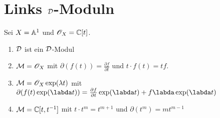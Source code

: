 
\chapter{Links $\mathcal{D}$-Moduln}

\begin{exmp}
Sei $X=\mathbb{A}^1$ und $\mathscr{O}_X=\mathbb{C}[t]$.
\begin{enumerate}
\item $\mathcal{D}$ ist ein $\mathcal{D}$-Modul
\item $\mathcal{M}=\mathscr{O}_X$ mit $\partial(f(t))=\frac{\partial f}{\partial t}$ und
$t\cdot f(t)=tf$.
\item $\mathcal{M}=\mathscr{O}_X\exp(\lambda t)$ mit $\partial(f(t)\exp(\labda
t))=\frac{\partial f}{\partial t}\exp(\labda t)+f\labda\exp(\labda t)$
\item $\mathcal{M}=\mathbb{C}[t,t^{-1}]$ mit $t\cdot t^{m}=t^{m+1}$ und
$\partial(t^m)=mt^{m-1}$
\end{enumerate}
\end{exmp}

\begin{comment}

  \section{Lokalisierung eines $\C\{x\}$-Moduls}

  \begin{defn}
    Sei $M$ ein $\C\{x\}$-Modul und $K=\C\{x\}[x^{-1}]$, dann ist die
    Lokalisierung
    \[ M[x^{-1}]:=M\otimes_{\C\{x\}}K \,. \]
  \end{defn}

  \section{Lokalisierung eines holonomen $\cD$-Moduls}
\end{comment}

